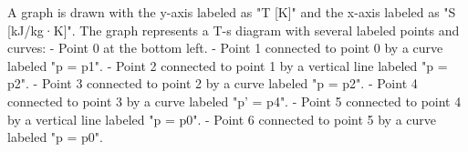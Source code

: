 A graph is drawn with the y-axis labeled as "T [K]" and the x-axis labeled as "S [kJ/kg·K]". The graph represents a T-s diagram with several labeled points and curves:  
- Point 0 at the bottom left.  
- Point 1 connected to point 0 by a curve labeled "p = p1".  
- Point 2 connected to point 1 by a vertical line labeled "p = p2".  
- Point 3 connected to point 2 by a curve labeled "p = p2".  
- Point 4 connected to point 3 by a curve labeled "p' = p4".  
- Point 5 connected to point 4 by a vertical line labeled "p = p0".  
- Point 6 connected to point 5 by a curve labeled "p = p0".